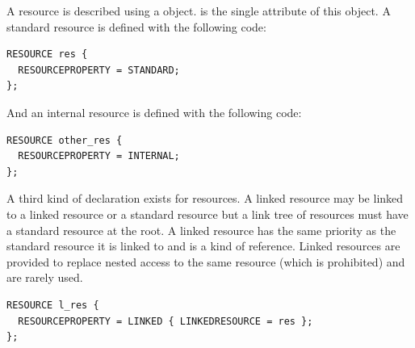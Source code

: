 A resource is described using a  object.  is the single attribute of this object. A standard resource is defined with the following code:

\begin{lstlisting}[language=OIL]
RESOURCE res {
  RESOURCEPROPERTY = STANDARD;
};
\end{lstlisting}

And an internal resource is defined with the following code:

\begin{lstlisting}[language=OIL]
RESOURCE other_res {
  RESOURCEPROPERTY = INTERNAL;
};
\end{lstlisting}

A third kind of declaration exists for {\bfseries{}} resources. A linked resource may be linked to a linked resource or a standard resource but a link tree of resources must have a standard resource at the root. A linked resource has the same priority as the standard resource it is linked to and is a kind of reference. Linked resources are provided to replace nested access to the same resource (which is prohibited) and are rarely used.

\begin{lstlisting}[language=OIL]
RESOURCE l_res {
  RESOURCEPROPERTY = LINKED { LINKEDRESOURCE = res };
};
\end{lstlisting}

